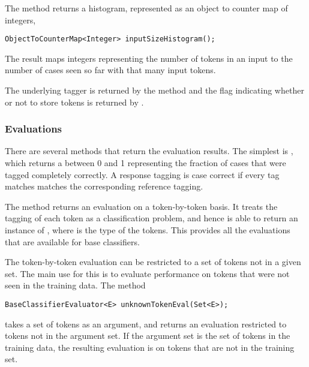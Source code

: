The method  returns a histogram, represented
as an object to counter map of integers,
%
\begin{verbatim}
ObjectToCounterMap<Integer> inputSizeHistogram();
\end{verbatim}
%
The result maps integers representing the number of tokens in an input
to the number of cases seen so far with that many input tokens.

The underlying tagger is returned by the method  and
the flag indicating whether or not to store tokens is returned
by .

\subsubsection{Evaluations}

There are several methods that return the evaluation results.  The
simplest is , which returns a 
between 0 and 1 representing the fraction of cases that were tagged
completely correctly.  A response tagging is case correct if every
tag matches matches the corresponding reference tagging.  

The method  returns an evaluation on a
token-by-token basis.  It treats the tagging of each token as a
classification problem, and hence is able to return an instance of
, where  is the type
of the tokens.  This provides all the evaluations that are available
for base classifiers.

The token-by-token evaluation can be restricted to a set of tokens not
in a given set.  The main use for this is to evaluate performance on
tokens that were not seen in the training data.  The method
%
\begin{verbatim}
BaseClassifierEvaluator<E> unknownTokenEval(Set<E>);
\end{verbatim}
%
takes a set of tokens as an argument, and returns an evaluation restricted
to tokens not in the argument set.  If the argument set is the set of
tokens in the training data, the resulting evaluation is on tokens
that are not in the training set.  




